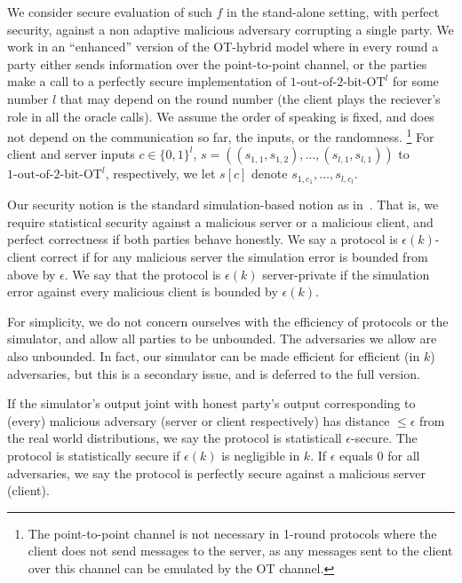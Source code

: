 \documentclass[a4paper]{article}
\newcommand{\OT}[2]{#1\text{-out-of-}#2\text{-bit-OT}}
\begin{document}
We consider secure evaluation of such $f$ in the stand-alone setting, with perfect security, against a non adaptive malicious adversary corrupting a single party.
We work in an ``enhanced'' version of the OT-hybrid model where in every round a party either sends information over the point-to-point channel, or the parties make a call to a perfectly secure implementation of ${\OT{1}{2}}^l$ for some number $l$ that may depend on the round number (the client plays the reciever's role in all the oracle calls). We assume the order of speaking is fixed, and does not depend on the communication so far, the inputs, or the randomness.
\footnote{The point-to-point channel is not necessary in 1-round protocols where the client does not send messages to the server, as any messages sent to the client over this channel can be emulated by the OT channel.} 
For client and server inputs $c\in\{0,1\}^l$, $s=((s_{1,1},s_{1,2}),\ldots,(s_{l,1},s_{l,1}))$ to ${\OT{1}{2}}^l$, respectively, we let $s[c]$ denote $s_{1,c_1},\ldots,s_{l,c_l}$.

Our security notion is the standard simulation-based notion as in~\cite{Can00}.
That is, we require statistical security against a malicious server or a malicious client, and perfect correctness if both parties behave honestly.
We say a protocol is $\epsilon(k)$-client correct if for any malicious server the simulation error is bounded from above by $\epsilon$.
We say that the protocol is $\epsilon(k)$ server-private if the simulation error against every malicious client is bounded by $\epsilon(k)$.

For simplicity, we do not concern ourselves with the efficiency 
of protocols or the simulator, and allow all parties to be unbounded.
The adversaries we allow are also unbounded.
In fact, our simulator can be made efficient for efficient (in $k$) adversaries, but this is a secondary issue, and is deferred to the full version.

If the simulator's output joint with honest party's output
corresponding to (every) malicious adversary (server or client respectively) has distance $\leq \epsilon$ from the real world distributions, we say the protocol is statisticall $\epsilon$-secure. The protocol is statistically secure if $\epsilon(k)$ is negligible in $k$. If $\epsilon$ equals 0 for all adversaries, we say the protocol is perfectly secure against a malicious server (client).
\end{document}
